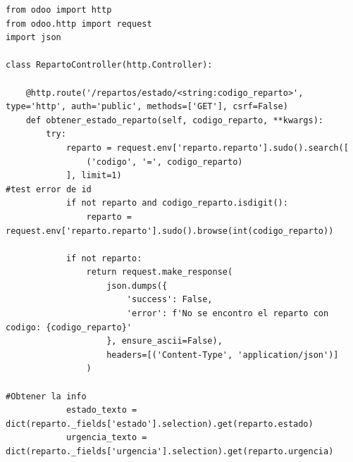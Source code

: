 \documentclass[a4paper, 11pt]{article}
\begin{document}
    \begin{lstlisting}[frame=single,breaklines=true]
        from odoo import http
from odoo.http import request
import json

class RepartoController(http.Controller):

    @http.route('/repartos/estado/<string:codigo_reparto>', type='http', auth='public', methods=['GET'], csrf=False)
    def obtener_estado_reparto(self, codigo_reparto, **kwargs):
        try:
            reparto = request.env['reparto.reparto'].sudo().search([
                ('codigo', '=', codigo_reparto)
            ], limit=1)
#test error de id
            if not reparto and codigo_reparto.isdigit():
                reparto = request.env['reparto.reparto'].sudo().browse(int(codigo_reparto))
            
            if not reparto:
                return request.make_response(
                    json.dumps({
                        'success': False,
                        'error': f'No se encontro el reparto con codigo: {codigo_reparto}'
                    }, ensure_ascii=False),
                    headers=[('Content-Type', 'application/json')]
                )
            
#Obtener la info 
            estado_texto = dict(reparto._fields['estado'].selection).get(reparto.estado)
            urgencia_texto = dict(reparto._fields['urgencia'].selection).get(reparto.urgencia)
            

\end{lstlisting}
\end{document}
